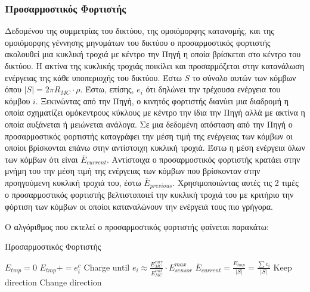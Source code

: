 \subsubsection{Προσαρμοστικός Φορτιστής}
Δεδομένου της συμμετρίας του δικτύου, της ομοιόμορφης κατανομής, και της ομοιόμορφης γέννησης μηνυμάτων του δικτύου ο προσαρμοστικός φορτιστής ακολουθεί μια κυκλική
τροχιά με κέντρο την Πηγή η οποία βρίσκεται στο κέντρο του δικτύου. Η ακτίνα της κυκλικής τροχιάς ποικίλει και προσαρμόζεται στην κατανάλωση ενέργειας της κάθε
υποπεριοχής του δικτύου. Έστω $S$ το σύνολο αυτών των κόμβων όπου $|S| = 2\pi R_{MC}\cdot \rho$. Έστω, επίσης, $e_{i}$ ότι δηλώνει την τρέχουσα ενέργεια του κόμβου
$i$. Ξεκινώντας από την Πηγή, ο κινητός φορτιστής διανύει μια διαδρομή η οποία σχηματίζει ομόκεντρους κύκλους με κέντρο την ίδια την Πηγή αλλά με ακτίνα η οποία
αυξάνεται ή μειώνεται ανάλογα. Σε μια δεδομένη απόσταση από την Πηγή ο προσαρμοστικός φορτιστής καταγράφει την μέση τιμή της ενέργειας των κόμβων οι οποίοι
βρίσκονται επάνω στην αντίστοιχη κυκλική τροχιά. Έστω η μέση ενέργεια όλων των κόμβων ότι είναι $\overline{E}_{current}$. Αντίστοιχα ο προσαρμοστικός φορτιστής
κρατάει στην μνήμη του την μέση τιμή της ενέργειας των κόμβων που βρίσκονταν στην προηγούμενη κυκλική τροχιά του, έστω $\overline{E}_{previous}$. Χρησιμοποιώντας
αυτές τις 2 τιμές ο προσαρμοστικός φορτιστής βελτιστοποιεί την κυκλική τροχιά του με κριτήριο την φόρτιση των κόμβων οι οποίοι καταναλώνουν την ενέργειά τους πιο
γρήγορα.

Ο αλγόριθμος που εκτελεί ο προσαρμοστικός φορτιστής φαίνεται παρακάτω:
\vspace{0.1cm}
\begin{algorithm}
\begin{algorithmic}
\caption{Προσαρμοστικός Φορτιστής}
\State $E_{tmp}=0$
\State $E_{tmp}+=e_{i}^{c}$
\State Charge until $e_{i} \approx \frac{E_{MC}^{curr}}{E_{MC}^{init}}\cdot E_{sensor}^{max}$
\EndFor
\State $\overline{E}_{current}=\frac{E_{tmp}}{|S|} = \frac{\sum e_{i}}{|S|}$
		\State	Keep direction
	\Else
		\State Change direction
	\EndIf
\EndIf
\EndWhile
\end{algorithmic}
\end{algorithm}

